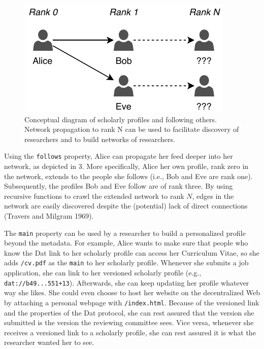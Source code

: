\documentclass[a4paper]{article}
\begin{document}
\begin{figure}

{\centering \includegraphics[width=1\linewidth]{assets/fig3} 

}

\caption{Conceptual diagram of scholarly profiles and following others. Network propagation to rank N can be used to facilitate discovery of researchers and to build networks of researchers.}\label{fig:unnamed-chunk-4}
\end{figure}

Using the \texttt{follows} property, Alice can propagate her feed deeper
into her network, as depicted in 3. More specifically, Alice her own
profile, rank zero in the network, extends to the people she follows
(i.e., Bob and Eve are rank one). Subsequently, the profiles Bob and Eve
follow are of rank three. By using recursive functions to crawl the
extended network to rank \(N\), edges in the network are easily
discovered despite the (potential) lack of direct connections (Travers
and Milgram 1969).

The \texttt{main} property can be used by a researcher to build a
personalized profile beyond the metadata. For example, Alice wants to
make sure that people who know the Dat link to her scholarly profile can
access her Curriculum Vitae, so she adds \texttt{/cv.pdf} as the
\texttt{main} to her scholarly profile. Whenever she submits a job
application, she can link to her versioned scholarly profile (e.g.,
\texttt{dat://b49...551+13}). Afterwards, she can keep updating her
profile whatever way she likes. She could even choose to host her
website on the decentralized Web by attaching a personal webpage with
\texttt{/index.html}. Because of the versioned link and the properties
of the Dat protocol, she can rest assured that the version she submitted
is the version the reviewing committee sees. Vice versa, whenever she
receives a versioned link to a scholarly profile, she can rest assured
it is what the researcher wanted her to see.
\end{document}

